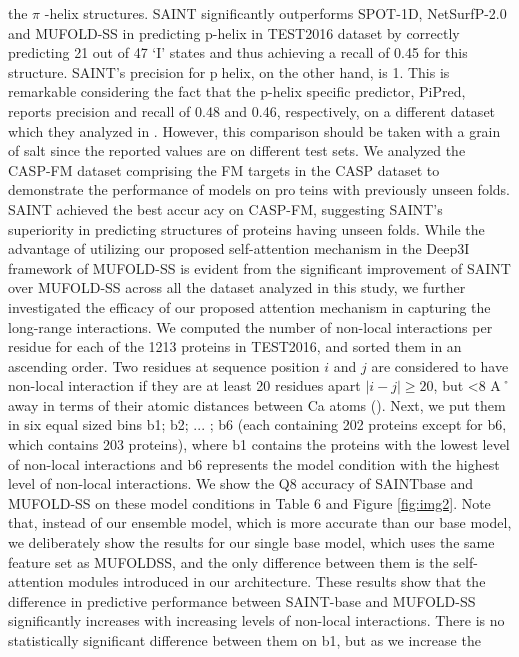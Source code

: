 \documentclass[8pt]{article}
\begin{document}
\begin{multicols}{2}
the $\pi$ -helix structures. SAINT significantly outperforms SPOT-1D,
NetSurfP-2.0 and MUFOLD-SS in predicting p-helix in TEST2016
dataset by correctly predicting 21 out of 47 ‘I’ states and thus
achieving a recall of 0.45 for this structure. SAINT’s precision for phelix, on the other hand, is 1. This is remarkable considering the
fact that the p-helix specific predictor, PiPred, reports precision and
recall of 0.48 and 0.46, respectively, on a different dataset which
they analyzed in \cite{ludwiczak2019pipred}. However, this comparison
should be taken with a grain of salt since the reported values are on
different test sets.
We analyzed the CASP-FM dataset comprising the FM targets in
the CASP dataset to demonstrate the performance of models on proteins with previously unseen folds. SAINT achieved the best accuracy on CASP-FM, suggesting SAINT’s superiority in predicting
structures of proteins having unseen folds.
While the advantage of utilizing our proposed self-attention
mechanism in the Deep3I framework of MUFOLD-SS is evident
from the significant improvement of SAINT over MUFOLD-SS
across all the dataset analyzed in this study, we further investigated
the efficacy of our proposed attention mechanism in capturing the
long-range interactions. We computed the number of non-local
interactions per residue for each of the 1213 proteins in TEST2016,
and sorted them in an ascending order. Two residues at sequence
position  $i$  and  $j$  are considered to have non-local interaction if they
are at least 20 residues apart  $| i - j | \geq 20$, but <8 A˚ away in terms
of their atomic distances between Ca atoms (\cite{heffernan2017capturing}).
Next, we put them in six equal sized bins b1; b2; ... ; b6 (each containing 202 proteins except for b6, which contains 203 proteins),
where b1 contains the proteins with the lowest level of non-local
interactions and b6 represents the model condition with the highest
level of non-local interactions. We show the Q8 accuracy of SAINTbase and MUFOLD-SS on these model conditions in Table 6 and
Figure \ref{fig:img2}. Note that, instead of our ensemble model, which is more
accurate than our base model, we deliberately show the results for
our single base model, which uses the same feature set as MUFOLDSS, and the only difference between them is the self-attention modules introduced in our architecture.
These results show that the difference in predictive performance
between SAINT-base and MUFOLD-SS significantly increases with
increasing levels of non-local interactions. There is no statistically
significant difference between them on b1, but as we increase the

\end{multicols}
\end{document}
